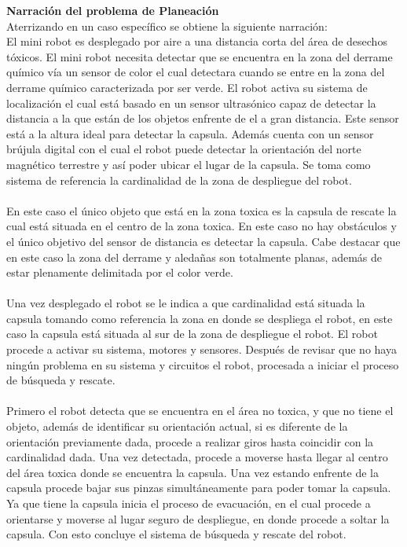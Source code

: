 \documentclass[letterpaper ,10pt]{article}
\begin{document}
{{\vspace{0.5cm}
\medskip
{\LARGE \textbf{ Narración del problema de Planeación}}
\vspace{0.2cm}
\\
Aterrizando en un caso específico se obtiene la siguiente narración:\\
El mini robot es desplegado por aire a una distancia corta del área de desechos tóxicos. El mini robot necesita detectar que se encuentra en la zona del derrame químico vía un sensor de color el cual detectara cuando se entre en la zona del derrame químico caracterizada por ser verde. El robot activa su sistema de localización el cual está basado en un sensor ultrasónico capaz de detectar la distancia a la que están de los objetos enfrente de el a gran distancia. Este sensor está a la altura ideal para detectar la capsula. Además cuenta con un sensor brújula digital con el cual el robot puede detectar la orientación del norte magnético terrestre y así poder ubicar el lugar de la capsula.  Se toma como sistema de referencia la cardinalidad de la zona de despliegue del robot.\\
\\
En este caso el único objeto que está en la zona toxica es la capsula de rescate la cual está situada en el centro de la zona toxica. En este caso no hay obstáculos y el único objetivo del sensor de distancia es detectar la capsula. Cabe destacar que en este caso la zona del derrame y aledañas son totalmente planas, además de estar plenamente delimitada por el color verde. \\ 
\\
Una vez desplegado el robot se le indica a que cardinalidad está situada la capsula tomando como referencia la zona en donde se despliega el robot, en este caso la capsula está situada al sur de la zona de despliegue el robot. El robot procede a activar su sistema, motores y sensores. Después de revisar que no haya ningún problema en su sistema y circuitos el robot, procesada a iniciar el proceso de búsqueda y rescate. \\
\\
Primero el robot detecta que se encuentra en el área no toxica, y que no tiene el objeto, además de identificar su orientación actual, si es diferente de la orientación previamente dada, procede a realizar giros hasta coincidir con la cardinalidad dada. Una vez detectada, procede a moverse hasta llegar al centro del área toxica donde se encuentra la capsula. Una vez estando enfrente de la capsula procede bajar sus pinzas simultáneamente para poder tomar la capsula. Ya que tiene la capsula inicia el proceso de evacuación, en el cual procede a orientarse y moverse al lugar seguro de despliegue, en donde procede a soltar la capsula. Con esto concluye el sistema de búsqueda y rescate del robot.\\
\newpage

}}
\end{document}
